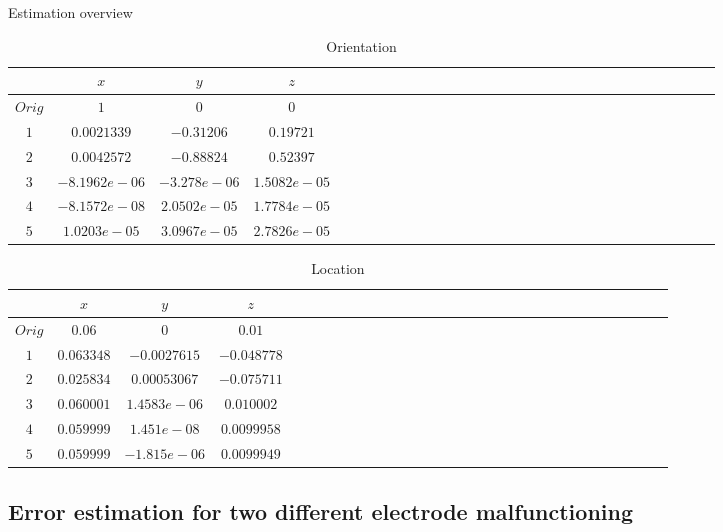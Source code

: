 \documentclass[t,12pt,english
\ifx\beamermode\undefined\else,\beamermode\fi
]{beamer}
\begin{document}
\begin{frame}{Estimation overview}

\begin{table}[!htbp]
\tiny
\centering
\caption{\small Orientation}
\begin{tabular}{c c c c c c c c c c c c c c c c c c c c c c c c c c c c c c c } 
   \hline 
$ $&$x$&$y$&$z$\\
   \hline 
$ Orig$&$1$&$0$&$0$\\
$1$&$0.0021339 $&$-0.31206$&$ 0.19721$\\
$2$&$ 0.0042572$&$ -0.88824$&$   0.52397$\\
$3$&$-8.1962e-06$&$-3.278e-06$&$  1.5082e-05$\\
$4$&$-8.1572e-08$&$2.0502e-05$&$1.7784e-05$\\
$5$&$1.0203e-05$&$3.0967e-05$&$2.7826e-05$\\
\hline 

\end{tabular}
\end{table}


 \begin{table}[!htbp]
 \tiny
\centering
\caption{\small Location}
\begin{tabular}{c c c c c c c c c c c c c c c c c c c c c c c c c c c c c c c } 
   \hline 
$ $&$x$&$y$&$z$\\
   \hline 
$ Orig$&$0.06$&$0$&$0.01$\\
$1$&$0.063348$&$-0.0027615$&$-0.048778$\\
$2$&$0.025834$&$0.00053067$&$-0.075711$\\ 
$3$&$0.060001$&$1.4583e-06 $&$0.010002$\\
$4$&$0.059999$&$1.451e-08$&$0.0099958 $\\
$5$&$0.059999$&$-1.815e-06$&$0.0099949 $\\
\hline 

\end{tabular}
\end{table}


\end{frame}

\subsection{Error estimation for two different electrode malfunctioning}
\end{document}
